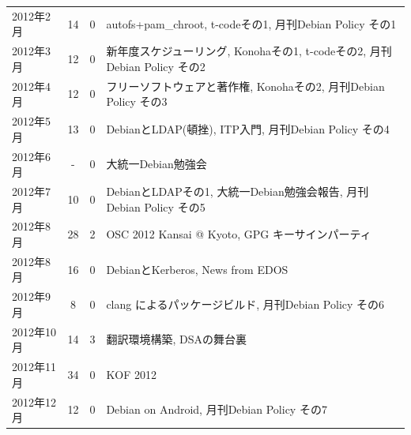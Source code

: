 \documentclass[mingoth,a4paper]{jsarticle}
\begin{document}
\begin{table}
\begin{center}
\begin{tabular}{|l|c|c|l|}
        2012年2月 &14        &0         & autofs+pam\_chroot, t-codeその1, 月刊Debian Policy その1 \\
        2012年3月 &12        &0         & 新年度スケジューリング, Konohaその1, t-codeその2, 月刊Debian Policy その2 \\
        2012年4月 &12        &0         & フリーソフトウェアと著作権, Konohaその2, 月刊Debian Policy その3 \\
        2012年5月 &13        &0         & DebianとLDAP(頓挫), ITP入門, 月刊Debian Policy その4 \\
        2012年6月 & -        &0         & 大統一Debian勉強会 \\
        2012年7月 &10        &0         & DebianとLDAPその1, 大統一Debian勉強会報告, 月刊Debian Policy その5 \\
        2012年8月 &28        &2         & OSC 2012 Kansai @ Kyoto, GPG キーサインパーティ\\
        2012年8月 &16        &0         & DebianとKerberos, News from EDOS \\
        2012年9月 & 8        &0         & clang によるパッケージビルド, 月刊Debian Policy その6 \\
        2012年10月&14        &3         & 翻訳環境構築, DSAの舞台裏\\
        2012年11月&34        &0         & KOF 2012\\
        2012年12月&12        &0         & Debian on Android, 月刊Debian Policy その7 \\
        \hline
      \end{tabular}
    \end{center}
\end{table}
\pagebreak
\end{document}
